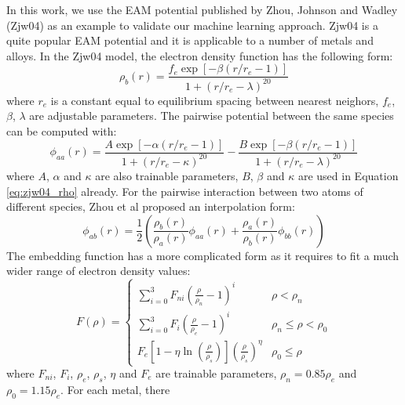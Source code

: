 \documentclass[prb,reprint]{revtex4-2}
\begin{document}
In this work, we use the EAM potential published by Zhou, Johnson and Wadley 
(Zjw04) as an example to validate our machine learning approach. Zjw04 is a 
quite popular EAM potential and it is applicable to a number of metals and 
alloys. In the Zjw04 model, the electron density function has the following 
form:
\begin{equation}
\label{eq:zjw04_rho}
\rho_{b}(r) = \frac{
    f_{e} \exp\left[ -\beta\left( r/r_{e} - 1 \right) \right]
}{
    1 + \left(r/r_{e} - \lambda\right)^{20}
}
\end{equation}
where $r_e$ is a constant equal to equilibrium spacing between nearest neighors, 
$f_{e}$, $\beta$, $\lambda$ are adjustable parameters. The pairwise potential 
between the same species can be computed with:
\begin{equation}
\label{eq:zjw04_phi_aa}
\phi_{aa}(r) = 
\frac{A \exp\left[ -\alpha\left( r/r_{e} - 1 \right) \right]}
     {1 + \left(r / r_{e} - \kappa\right)^{20}} - 
\frac{B \exp\left[ -\beta\left( r/r_{e} - 1 \right) \right]}
     {1 + \left(r / r_{e} - \lambda\right)^{20}}
\end{equation}
where $A$, $\alpha$ and $\kappa$ are also trainable parameters, $B$, $\beta$ and 
$\kappa$ are used in Equation \ref{eq:zjw04_rho} already. For the pairwise 
interaction between two atoms of different species, Zhou et al proposed an 
interpolation form:
\begin{equation}
\label{eq:zjw04_phi_ab}
\phi_{ab}(r) = \frac{1}{2}\left(
    \frac{\rho_{b}(r)}{\rho_{a}(r)}\phi_{aa}(r) +
    \frac{\rho_{a}(r)}{\rho_{b}(r)}\phi_{bb}(r) 
\right)
\end{equation}
The embedding function has a more complicated form as it requires to fit a much 
wider range of electron density values:
\begin{equation}
\label{eq:zjw04_embed}
F(\rho) = \begin{cases}
    \sum_{i=0}^{3}{F_{ni}\left( \frac{\rho}{\rho_n} - 1 \right)^{i}} &
    \rho < \rho_{n} \\
    \sum_{i=0}^{3}{F_{i}\left( \frac{\rho}{\rho_e} - 1 \right)^{i}} &
    \rho_{n} \leq \rho < \rho_{0} \\
    F_{e}\left[ 
        1 - \eta\ln\left( \frac{\rho}{\rho_s}\right) 
    \right](\frac{\rho}{\rho_s})^{\eta} & \rho_{0} \leq \rho
\end{cases}
\end{equation}
where $F_{ni}$, $F_{i}$, $\rho_e$, $\rho_s$, $\eta$ and $F_{e}$ are trainable 
parameters, $\rho_n=0.85\rho_e$ and $\rho_0=1.15\rho_e$. For each metal, there 
\end{document}
